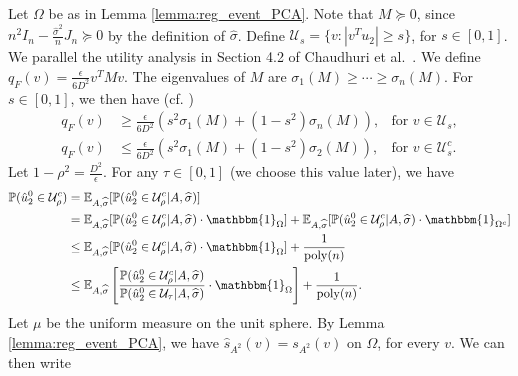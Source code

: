 \documentclass{article}
\newcommand{\mprob}{\mathbb{P}}
\newcommand{\sigmahat}{\ensuremath{\widehat{\sigma}}}
\begin{document}
Let $\Omega$ be as in Lemma \ref{lemma:reg_event_PCA}. Note that $M \succeq 0$, since $n^2I_n -\frac{\sigmahat^2}{n}J_n \succeq 0$ by the definition of $\sigmahat$. Define $\mathcal{U}_s = \{v: |v^Tu_2| \ge s\}$, for $s \in [0, 1]$. We parallel the utility analysis in Section 4.2 of Chaudhuri et al.~\cite{ChaEtal13}. We define $q_F(v) = \frac{\epsilon}{6D^2}v^T Mv$. The eigenvalues of $M$ are $\sigma_1(M) \geq \cdots \ge \sigma_n(M)$. For $s \in [0, 1]$, we then have (cf. \cite{ChaEtal13})
\begin{align*}
q_F(v) & \ge \frac{\epsilon}{6D^2} \left(s^2 \sigma_1(M) + (1 - s^2) \sigma_n(M)\right), & \text{for } v \in \mathcal{U}_s, \\
%
q_F(v) & \le \frac{\epsilon}{6D^2} \left(s^2 \sigma_1(M) + (1-s^2)\sigma_2(M)\right), & \text{for } v \in \mathcal{U}^c_s.
\end{align*}
Let $1 - \rho^2 = \frac{D^2}{\epsilon}$. For any $\tau \in [0, 1]$ (we choose this value later), we have
\begin{align}
\label{eq:Urho^c}
\mprob(\hat{u}_2^0 \in \mathcal{U}^c_\rho) & = \mathbb{E}_{A, \sigmahat}[\mprob(\hat{u}_2^0 \in \mathcal{U}^c_\rho|A, \sigmahat)] \notag \\
%
& = \mathbb{E}_{A, \sigmahat}[\mprob(\hat{u}_2^0 \in \mathcal{U}^c_\rho|A, \sigmahat)\cdot \mathbbm{1}_{\Omega}] + \mathbb{E}_{A, \sigmahat}[\mprob(\hat{u}_2^0 \in \mathcal{U}^c_\rho|A, \sigmahat)\cdot \mathbbm{1}_{\Omega^c}] \notag\\
&\leq \mathbb{E}_{A, \sigmahat}[\mprob(\hat{u}_2^0 \in \mathcal{U}^c_\rho|A, \sigmahat)\cdot \mathbbm{1}_{\Omega}] + \frac{1}{\mathrm{poly}(n)} \notag \\
%
& \leq \mathbb{E}_{A, \sigmahat}\left[\frac{\mprob(\hat{u}_2^0 \in \mathcal{U}^c_\rho|A, \sigmahat)}{\mprob(\hat{u}_2^0 \in \mathcal{U}_\tau|A, \sigmahat)}\cdot \mathbbm{1}_{\Omega}\right] + \frac{1}{\mathrm{poly}(n)}.
\end{align}
Let $\mu$ be the uniform measure on the unit sphere. By Lemma \ref{lemma:reg_event_PCA}, we have $\widehat{s}_{A^2}(v) = s_{A^2}(v)$ on $\Omega$, for every $v$. We can then write
\end{document}
